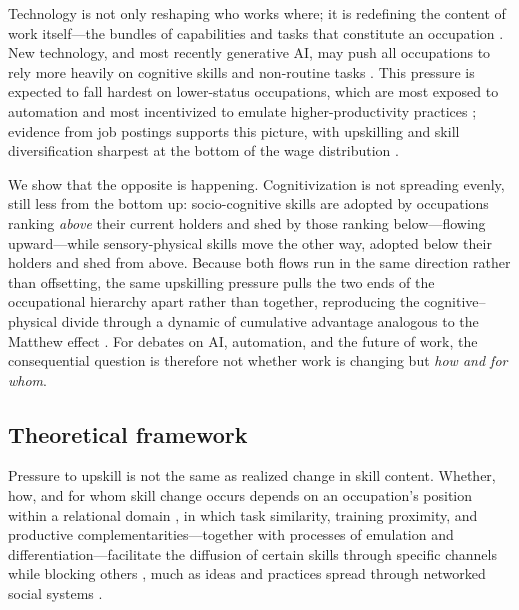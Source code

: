 \documentclass[11pt, letterpaper]{article} %
\newcommand{\parencite}[1]{\cite{#1}}
\begin{document}
Technology is not only reshaping who works where; it is redefining the content of work itself---the bundles of capabilities and tasks that constitute an occupation \parencite{weeden_case_2005, labussiere_are_2026}. New technology, and most recently generative AI, may push all occupations to rely more heavily on cognitive skills and non-routine tasks \parencite{autor_skill_2003, spitz_oener_technical_2006, oesch_upgrading_2011, eloundou_gpts_2024, noy_experimental_2023}. This pressure is expected to fall hardest on lower-status occupations, which are most exposed to automation and most incentivized to emulate higher-productivity practices \parencite{acemoglu_robots_2020, goos_routine_2014, autor_skill_2015}; evidence from job postings supports this picture, with upskilling and skill diversification sharpest at the bottom of the wage distribution \parencite{tong_lower-skilled_2025, han_skill_2026}.

We show that the opposite is happening. Cognitivization is not spreading evenly, still less from the bottom up: socio-cognitive skills are adopted by occupations ranking \emph{above} their current holders and shed by those ranking below---flowing upward---while sensory-physical skills move the other way, adopted below their holders and shed from above. Because both flows run in the same direction rather than offsetting, the same upskilling pressure pulls the two ends of the occupational hierarchy apart rather than together, reproducing the cognitive--physical divide through a dynamic of cumulative advantage analogous to the Matthew effect \parencite{Merton1968}. For debates on AI, automation, and the future of work, the consequential question is therefore not whether work is changing but \emph{how and for whom}.

\subsection*{Theoretical framework}

Pressure to upskill is not the same as realized change in skill content. Whether, how, and for whom skill change occurs depends on an occupation's position within a relational domain \parencite{cheng_flows_2020, lin_network_2022, rytina_network_2020}, in which task similarity, training proximity, and productive complementarities---together with processes of emulation and differentiation---facilitate the diffusion of certain skills through specific channels while blocking others \parencite{strang_institutional_1993, hidalgo_product_2007, wimmer_domains_2021, bail_prestige_2019}, much as ideas and practices spread through networked social systems \parencite{watts_cascades_2002, banerjee_diffusion_2013, vosoughi_spread_2018}.
\end{document}
